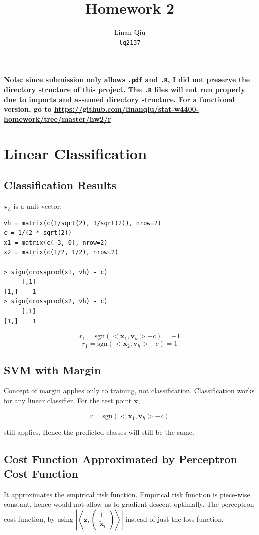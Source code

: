 \documentclass[11pt]{scrartcl}
\title{Homework 2}
\author{Linan Qiu\\\texttt{lq2137}}
\newcommand{\sgn}{\ensuremath{\mathrm{sgn}}}
\begin{document}
\maketitle

\textbf{Note: since submission only allows \texttt{.pdf} and \texttt{.R}, I did not preserve the directory structure of this project. The \texttt{.R} files will not run properly due to imports and assumed directory structure. For a functional version, go to \url{https://github.com/linanqiu/stat-w4400-homework/tree/master/hw2/r}}

\section{Linear Classification}

\subsection{Classification Results}

$\mathbf{v}_h$ is a unit vector.

\begin{lstlisting}
vh = matrix(c(1/sqrt(2), 1/sqrt(2)), nrow=2)
c = 1/(2 * sqrt(2))
x1 = matrix(c(-3, 0), nrow=2)
x2 = matrix(c(1/2, 1/2), nrow=2)

> sign(crossprod(x1, vh) - c)
     [,1]
[1,]   -1
> sign(crossprod(x2, vh) - c)
     [,1]
[1,]    1
\end{lstlisting}

\[r_1 = \sgn(<\mathbf{x}_1, \mathbf{v}_h> - c) = -1 \]
\[r_1 = \sgn(<\mathbf{x}_2, \mathbf{v}_h> - c) = 1 \]

\subsection{SVM with Margin}

Concept of margin applies only to training, not classification. Classification works for any linear classifier. For the test point $\mathbf{x}$,

\[r = \sgn(<\mathbf{x}_1, \mathbf{v}_h> - c)\]

still applies. Hence the predicted classes will still be the same.

\subsection{Cost Function Approximated by Perceptron Cost Function}

It approximates the empirical risk function. Empirical risk function is piece-wise constant, hence would not allow us to gradient descent optimally. The perceptron cost function, by using $\left|\left<\mathbf{z} ,\begin{pmatrix}1 \\ \tilde{\mathbf{x}}_i \end{pmatrix}\right>\right|$ instead of just the loss function.
\end{document}

